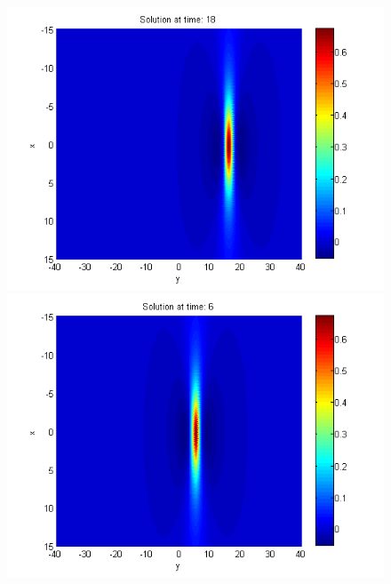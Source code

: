 \documentclass[a4paper]{article}
\theoremstyle{remark}
\begin{document}
\begin{large}
\begin{figure}[ht]
\begin{minipage}[b]{0.48\linewidth}
		\includegraphics[width=\linewidth]{../amitans/figures/solution_128x90_bt1_c090_T18.png}		
	\end{minipage}	
	\begin{minipage}[b]{0.48\linewidth}
		\includegraphics[width=\linewidth]{../amitans/figures/solution_128x90_bt1_c090_T6.png}
	\end{minipage}
	\begin{minipage}[b]{0.48\linewidth}

\end{minipage}
\end{figure}
\end{large}
\end{document}
